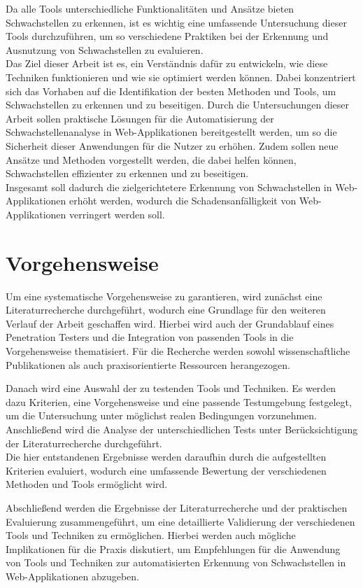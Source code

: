 Da alle Tools unterschiedliche Funktionalitäten und Ansätze bieten Schwachstellen zu erkennen, ist es wichtig eine umfassende Untersuchung dieser Tools durchzuführen, um so verschiedene Praktiken bei der Erkennung und Ausnutzung von Schwachstellen zu evaluieren. \\
Das Ziel dieser Arbeit ist es, ein Verständnis dafür zu entwickeln, wie diese Techniken funktionieren und wie sie optimiert werden können.
Dabei konzentriert sich das Vorhaben auf die Identifikation der besten Methoden und Tools, um Schwachstellen zu erkennen und zu beseitigen. 
Durch die Untersuchungen dieser Arbeit sollen praktische Lösungen für die Automatisierung der Schwachstellenanalyse in Web-Applikationen bereitgestellt werden, um so die Sicherheit dieser Anwendungen für die Nutzer zu erhöhen. Zudem sollen neue Ansätze und Methoden vorgestellt werden, die dabei helfen können, Schwachstellen effizienter zu erkennen und zu beseitigen. \\
Insgesamt soll dadurch die zielgerichtetere Erkennung von Schwachstellen in Web-Applikationen erhöht werden, wodurch die Schadensanfälligkeit von Web-Applikationen verringert werden soll. 

\section{Vorgehensweise}

Um eine systematische Vorgehensweise zu garantieren, wird zunächst eine Literaturrecherche durchgeführt, wodurch eine Grundlage für den weiteren Verlauf der Arbeit geschaffen wird. 
Hierbei wird auch der Grundablauf eines Penetration Testers und die Integration von passenden Tools in die Vorgehensweise thematisiert.
Für die Recherche werden sowohl wissenschaftliche Publikationen als auch praxisorientierte Ressourcen herangezogen.

Danach wird eine Auswahl der zu testenden Tools und Techniken. Es werden dazu Kriterien, eine Vorgehensweise und eine passende Testumgebung festgelegt, um die Untersuchung unter möglichst realen Bedingungen vorzunehmen. \\
Anschließend wird die Analyse der unterschiedlichen Tests unter Berücksichtigung der Literaturrecherche durchgeführt. \\
Die hier entstandenen Ergebnisse werden daraufhin durch die aufgestellten Kriterien evaluiert, wodurch eine umfassende Bewertung der verschiedenen Methoden und Tools ermöglicht wird.

Abschließend werden die Ergebnisse der Literaturrecherche und der praktischen Evaluierung zusammengeführt, um eine detaillierte Validierung der verschiedenen Tools und Techniken zu ermöglichen. Hierbei werden auch mögliche Implikationen für die Praxis diskutiert, um Empfehlungen für die Anwendung von Tools und Techniken zur automatisierten Erkennung von Schwachstellen in Web-Applikationen abzugeben.

